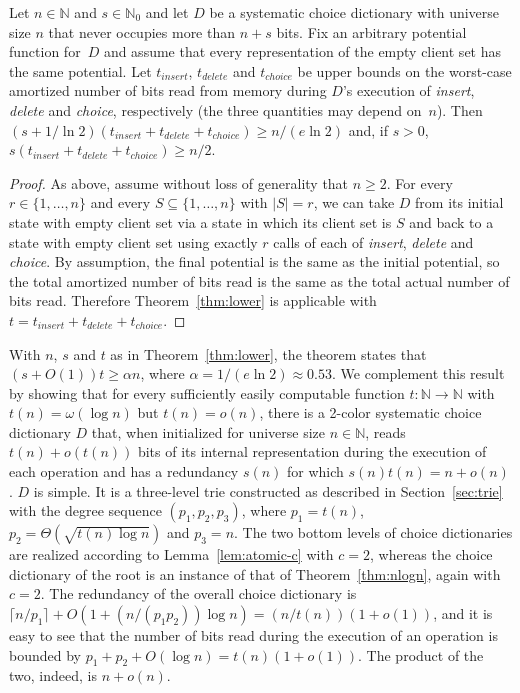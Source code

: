 \documentclass[envcountsame,envcountsect,undated,nolinenumbers]{lnthi}
\def\Tvn#1{\hbox{\textit{#1\/}}}
\def\Tceil#1{\lceil #1\rceil}
\def\TbbbN{\mathbb{N}}
\def\Ttvn#1{t_{\mathit{#1}}}
\begin{document}
\begin{corollary}
Let $n\in\TbbbN$ and $s\in\TbbbN_0$ and let $D$ be a systematic
choice dictionary with universe size $n$ that
never occupies more than $n+s$ bits.
Fix an arbitrary potential function for~$D$
and assume that every representation of the
empty client set has the same potential.
Let $\Ttvn{insert}$, $\Ttvn{delete}$
and $\Ttvn{choice}$ be upper bounds
on the worst-case amortized
number of bits read from memory during $D$'s execution of
\Tvn{insert}, \Tvn{delete} and \Tvn{choice}, respectively
(the three quantities may depend on~$n$).
Then
$(s+{1/{\ln 2}})
 (\Ttvn{insert}+\Ttvn{delete}+\Ttvn{choice})\ge {n/{(e\ln 2)}}$
and, if $s>0$,
$s(\Ttvn{insert}+\Ttvn{delete}+\Ttvn{choice})\ge{n/2}$.
\end{corollary}

\begin{proof}
As above, assume without loss of generality that $n\ge 2$.
For every $r\in\{1,\ldots,n\}$ and every
$S\subseteq\{1,\ldots,n\}$ with $|S|=r$, we can take $D$
from its initial state with empty client set
via a state in which its client set is $S$
and back to a state with empty client set
using exactly $r$ calls of each of
\Tvn{insert}, \Tvn{delete} and \Tvn{choice}.
By assumption, the final potential is the
same as the initial potential, so the total
amortized number of bits read is the same as the
total actual number of bits read.
Therefore Theorem~\ref{thm:lower} is applicable with
$t=\Ttvn{insert}+\Ttvn{delete}+\Ttvn{choice}$.
\end{proof}

With $n$, $s$ and $t$ as in Theorem~\ref{thm:lower},
the theorem states that $(s+O(1))t\ge\alpha n$,
where $\alpha={1/{(e\ln 2)}}\approx0.53$.
We complement this result by showing that for every
sufficiently easily computable
function $t:\TbbbN\to\TbbbN$ with
$t(n)=\omega(\log n)$ but $t(n)=o(n)$, there is a 2-color
systematic choice dictionary $D$ that, when
initialized for universe size $n\in\TbbbN$,
reads $t(n)+o(t(n))$ bits of its internal
representation during the execution of each
operation and has a redundancy $s(n)$
for which $s(n)t(n)=n+o(n)$.
$D$ is simple.
It is a three-level trie constructed as described
in Section~\ref{sec:trie}
with the degree sequence $(p_1,p_2,p_3)$,
where $p_1=t(n)$, $p_2=\Theta(\sqrt{t(n)\log n})$
and $p_3=n$.
The two bottom levels of choice dictionaries are realized
according to Lemma~\ref{lem:atomic-c} with $c=2$,
whereas the choice dictionary of the root
is an instance of that of Theorem~\ref{thm:nlogn},
again with $c=2$.
The redundancy of the overall choice dictionary is
$\Tceil{{n/{p_1}}}+O(1+({n/{(p_1 p_2)}})\log n)=
({n/{t(n)}})(1+o(1))$,
and it is easy to see that the number of bits read
during the execution of an operation is bounded by
$p_1+p_2+O(\log n)=t(n)(1+o(1))$.
The product of the two, indeed, is
$n+o(n)$.
\end{document}
